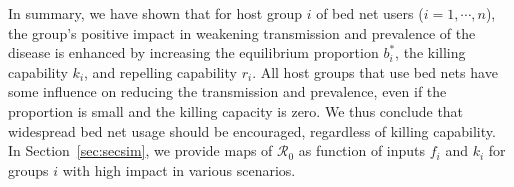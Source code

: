 \documentclass[a4paper]{article}
\newcommand{\varpiVar}{r_{suc}}
\newcommand{\miVar}{\varphi_i}
\begin{document}
%
In summary, we have shown that for  host group $i$ of bed net users ($i=1,\cdots ,n$), the group's positive impact  in  weakening  transmission and prevalence of the disease  is enhanced by increasing  the equilibrium proportion $b^*_i$, the  killing capability $k_i$, and repelling capability $r_i$. All host groups that use bed nets have some influence on reducing the transmission and prevalence, even if the proportion is small and the killing capacity is zero. We thus conclude that widespread bed net usage should be encouraged,  regardless of  killing capability. In Section~\ref{sec:secsim}, we provide maps of $\mathcal R_0$ as function of inputs $f_i$ and $k_i$ for groups $i$ with high impact in various scenarios. 



\end{document}
